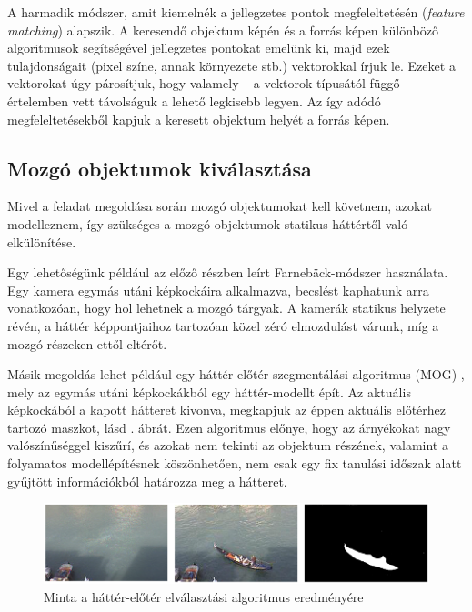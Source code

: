 A harmadik módszer, amit kiemelnék a jellegzetes pontok megfeleltetésén (\textit{feature matching}) alapszik. A keresendő objektum képén és a forrás képen különböző algoritmusok segítségével jellegzetes pontokat emelünk ki, majd ezek tulajdonságait (pixel színe, annak környezete stb.) vektorokkal írjuk le. Ezeket a vektorokat úgy párosítjuk, hogy valamely -- a vektorok típusától függő -- értelemben vett távolságuk a lehető legkisebb legyen. Az így adódó megfeleltetésekből kapjuk a keresett objektum helyét a forrás képen.

\subsection{Mozgó objektumok kiválasztása \label{sec:moving_obj_detection}}

Mivel a feladat megoldása során mozgó objektumokat kell követnem, azokat modelleznem, így szükséges a mozgó objektumok statikus háttértől való elkülönítése.

Egy lehetőségünk például az előző részben leírt Farnebäck-módszer használata. Egy kamera egymás utáni képkockáira alkalmazva, becslést kaphatunk arra vonatkozóan, hogy hol lehetnek a mozgó tárgyak. A kamerák statikus helyzete révén, a háttér képpontjaihoz tartozóan közel zéró elmozdulást várunk, míg a mozgó részeken ettől eltérőt.

Másik megoldás lehet például egy háttér-előtér szegmentálási algoritmus (MOG) \cite{MOG}, mely az egymás utáni képkockákból egy háttér-modellt épít. Az aktuális képkockából a kapott hátteret kivonva, megkapjuk az éppen aktuális előtérhez tartozó maszkot, lásd . ábrát. Ezen algoritmus előnye, hogy az árnyékokat nagy valószínűséggel kiszűrí, és azokat nem tekinti az objektum részének, valamint a folyamatos modellépítésnek köszönhetően, nem csak egy fix tanulási időszak alatt gyűjtött információkból határozza meg a hátteret.

\begin{figure}[tbh]
\centering
\includegraphics{figures/mog.png}
\caption{Minta a háttér-előtér elválasztási algoritmus eredményére \cite{mog-example} \label{fig:mog-example}}
\end{figure}


